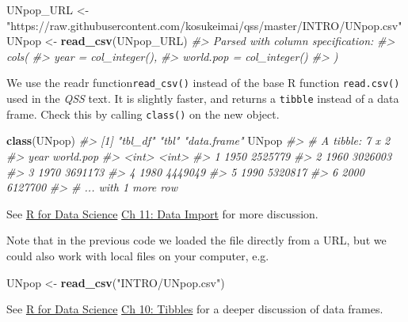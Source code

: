 \documentclass[]{book}
\newenvironment{Shaded}{\begin{snugshade}}{\end{snugshade}}
\newcommand{\KeywordTok}[1]{\textcolor[rgb]{0.13,0.29,0.53}{\textbf{#1}}}
\newcommand{\StringTok}[1]{\textcolor[rgb]{0.31,0.60,0.02}{#1}}
\newcommand{\CommentTok}[1]{\textcolor[rgb]{0.56,0.35,0.01}{\textit{#1}}}
\newcommand{\NormalTok}[1]{#1}
\theoremstyle{definition}
\theoremstyle{definition}
\theoremstyle{definition}
\theoremstyle{remark}
\begin{document}
\begin{Shaded}
\begin{Highlighting}[]
\NormalTok{UNpop_URL <-}\StringTok{ "https://raw.githubusercontent.com/kosukeimai/qss/master/INTRO/UNpop.csv"}
\NormalTok{UNpop <-}\StringTok{ }\KeywordTok{read_csv}\NormalTok{(UNpop_URL)}
\CommentTok{#> Parsed with column specification:}
\CommentTok{#> cols(}
\CommentTok{#>   year = col_integer(),}
\CommentTok{#>   world.pop = col_integer()}
\CommentTok{#> )}
\end{Highlighting}
\end{Shaded}

We use the readr function\texttt{read\_csv()} instead of the base R
function \texttt{read.csv()} used in the \emph{QSS} text. It is slightly
faster, and returns a \texttt{tibble} instead of a data frame. Check
this by calling \texttt{class()} on the new object.

\begin{Shaded}
\begin{Highlighting}[]
\KeywordTok{class}\NormalTok{(UNpop)}
\CommentTok{#> [1] "tbl_df"     "tbl"        "data.frame"}
\NormalTok{UNpop}
\CommentTok{#> # A tibble: 7 x 2}
\CommentTok{#>    year world.pop}
\CommentTok{#>   <int>     <int>}
\CommentTok{#> 1  1950   2525779}
\CommentTok{#> 2  1960   3026003}
\CommentTok{#> 3  1970   3691173}
\CommentTok{#> 4  1980   4449049}
\CommentTok{#> 5  1990   5320817}
\CommentTok{#> 6  2000   6127700}
\CommentTok{#> # ... with 1 more row}
\end{Highlighting}
\end{Shaded}

See \href{http://r4ds.had.co.nz/}{R for Data Science}
\href{http://r4ds.had.co.nz/tibbles.html\#introduction-4}{Ch 11: Data
Import} for more discussion.

Note that in the previous code we loaded the file directly from a URL,
but we could also work with local files on your computer, e.g.

\begin{Shaded}
\begin{Highlighting}[]
\NormalTok{UNpop <-}\StringTok{ }\KeywordTok{read_csv}\NormalTok{(}\StringTok{"INTRO/UNpop.csv"}\NormalTok{)}
\end{Highlighting}
\end{Shaded}

See \href{http://r4ds.had.co.nz/}{R for Data Science}
\href{http://r4ds.had.co.nz/tibbles.html}{Ch 10: Tibbles} for a deeper
discussion of data frames.
\end{document}
